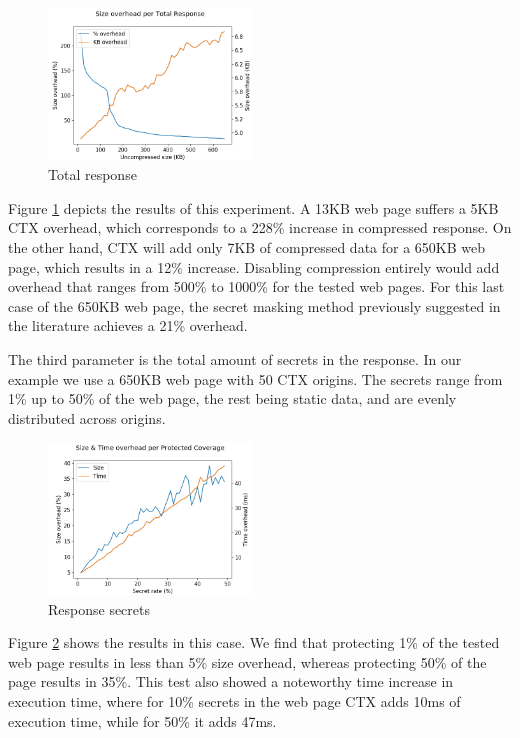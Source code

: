     \begin{figure}[thpb]
        \centering
            \includegraphics[width=0.48\textwidth]{experiments/ctx_performance/total_response.png}
        \caption{Total response}
        \label{fig:total_response_ctx}
    \end{figure}

Figure \ref{fig:total_response_ctx} depicts the results of this experiment. A 13KB web page suffers a 5KB
CTX overhead, which corresponds to a 228\% increase in compressed response. On the
other hand, CTX will add only 7KB of compressed data for a 650KB web page, which
results in a 12\% increase. Disabling compression entirely would add overhead
that ranges from 500\% to 1000\% for the tested web pages. For this last case
of the 650KB web page, the secret masking method previously suggested in the
literature achieves a 21\% overhead.

The third parameter is the total amount of secrets in the response. In our
example we use a 650KB web page with 50 CTX origins. The secrets range from 1\%
up to 50\% of the web page, the rest being static data, and are evenly
distributed across origins.

    \begin{figure}[thpb]
        \centering
            \includegraphics[width=0.48\textwidth]{experiments/ctx_performance/response_secrets.png}
        \caption{Response secrets}
        \label{fig:response_secrets_ctx}
    \end{figure}

Figure \ref{fig:response_secrets_ctx} shows the results in this case. We find that protecting 1\% of the
tested web page results in less than 5\% size overhead, whereas protecting 50\% of
the page results in 35\%. This test also showed a noteworthy time increase in
execution time, where for 10\% secrets in the web page CTX adds 10ms of
execution time, while for 50\% it adds 47ms.

